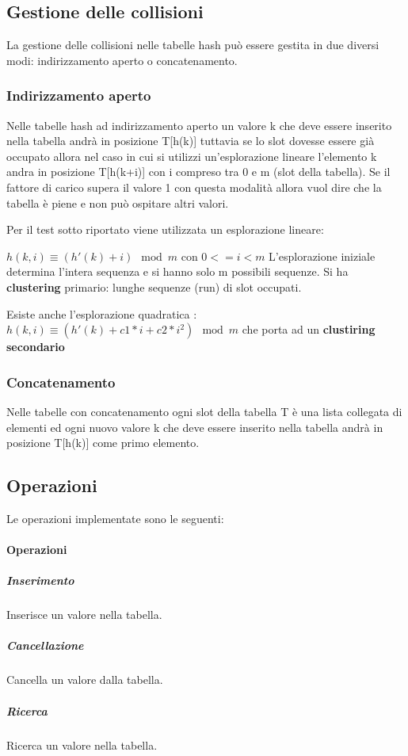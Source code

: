 \documentclass{article}
\begin{document}
\subsection{Gestione delle collisioni}
La gestione delle collisioni nelle tabelle hash può essere gestita in due diversi modi: indirizzamento aperto o concatenamento.

\subsubsection{Indirizzamento aperto}
Nelle tabelle hash ad indirizzamento aperto un valore k che deve essere inserito nella tabella andrà in posizione T[h(k)] tuttavia se lo slot dovesse essere già occupato allora nel caso in cui si utilizzi un'esplorazione lineare l'elemento k andra in posizione T[h(k+i)] con i compreso tra 0 e m (slot della tabella). Se il fattore di carico supera il valore 1 con questa modalità allora vuol dire che la tabella è piene e non può ospitare altri valori.

Per il test sotto riportato viene utilizzata un esplorazione lineare:

$ h(k,i) \equiv (h'(k)+i) \mod m $ con $0<=i<m$
L'esplorazione iniziale determina l'intera sequenza e si hanno solo m possibili sequenze. Si ha \textbf{clustering} primario: lunghe sequenze (run) di slot occupati.

Esiste anche l'esplorazione quadratica : $ h(k,i) \equiv (h'(k)+c1*i+c2*i^2) \mod m $ che porta ad un \textbf{clustiring secondario}

\subsubsection{Concatenamento}
Nelle tabelle con concatenamento ogni slot della tabella T è una lista collegata di elementi ed ogni nuovo valore k che deve essere inserito nella tabella andrà in posizione T[h(k)] come primo elemento.

\subsection{Operazioni}

Le operazioni implementate sono le seguenti:

\paragraph{Operazioni}
\subparagraph{Inserimento}Inserisce un valore nella tabella.
\subparagraph{Cancellazione}Cancella un valore dalla tabella.
\subparagraph{Ricerca}Ricerca un valore nella tabella.
\end{document}
